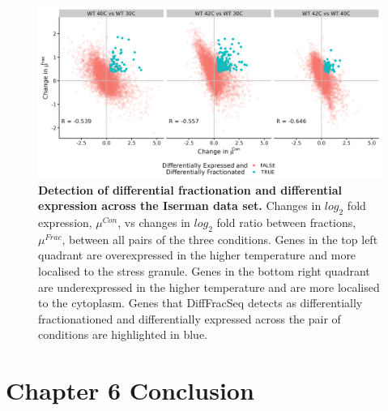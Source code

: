 \documentclass[../main.tex]{subfiles}
\begin{document}
\begin{figure}

{\centering \includegraphics[width=1\linewidth]{figures/DESeq_vs_bayesian_multi_temp_iserman_combined.png} 

}

\caption[Detection of differential expression and fractionation across temperatures.]{\textbf{Detection of differential fractionation and differential expression across the Iserman data set.} Changes in $log_2$ fold expression, $\mu^{Con}$, vs changes in $log_2$ fold ratio between fractions, $\mu^{Frac}$, between all pairs of the three conditions.
Genes in the top left quadrant are overexpressed in the higher temperature and more localised to the stress granule. Genes in the bottom right quadrant are underexpressed in the higher temperature and are more localised to the cytoplasm. Genes that DiffFracSeq detects as differentially fractionationed and differentially expressed across the pair of conditions are highlighted in blue.} \label{fig:diff-exp-temp}
\end{figure}

\section{Chapter 6 Conclusion}
\end{document}

